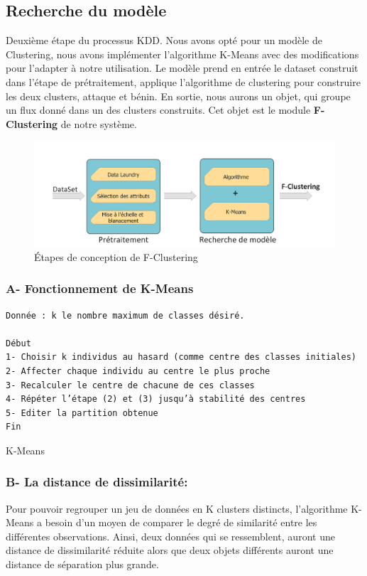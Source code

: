 \subsection{Recherche du modèle}
Deuxième étape du processus KDD. Nous avons opté pour un modèle de Clustering, nous avons implémenter l'algorithme K-Means avec des modifications pour l'adapter à notre utilisation. Le modèle prend en entrée le dataset construit dans l'étape de prétraitement, applique l'algorithme de clustering pour construire les deux clusters, attaque et bénin. En sortie, nous aurons un objet, qui groupe un flux donné dans un des clusters construits. Cet objet est le module \textbf{F-Clustering} de notre système.
\begin{figure}[h]
\centering
\includegraphics[width=\textwidth]{Figures/Diagramme2}
\decoRule
\caption{Étapes de conception de F-Clustering}
\label{fig:F-Clustering_Diagramme}
\end{figure} 

\subsubsection{A- Fonctionnement de K-Means} 
\begin{algorithm}[H]
\begin{verbatim}
Donnée : k le nombre maximum de classes désiré.

Début 
1- Choisir k individus au hasard (comme centre des classes initiales)
2- Affecter chaque individu au centre le plus proche 
3- Recalculer le centre de chacune de ces classes 
4- Répéter l’étape (2) et (3) jusqu’à stabilité des centres 
5- Editer la partition obtenue 
Fin
\end{verbatim}
\caption{K-Means}
\end{algorithm}

\subsubsection{B- La distance de dissimilarité:}
Pour pouvoir regrouper un jeu de données en K clusters distincts, l’algorithme K-Means a besoin d’un moyen de comparer le degré de similarité entre les différentes observations. Ainsi, deux données qui se ressemblent, auront une distance de dissimilarité réduite alors que deux objets différents auront une distance de séparation plus grande.\\


